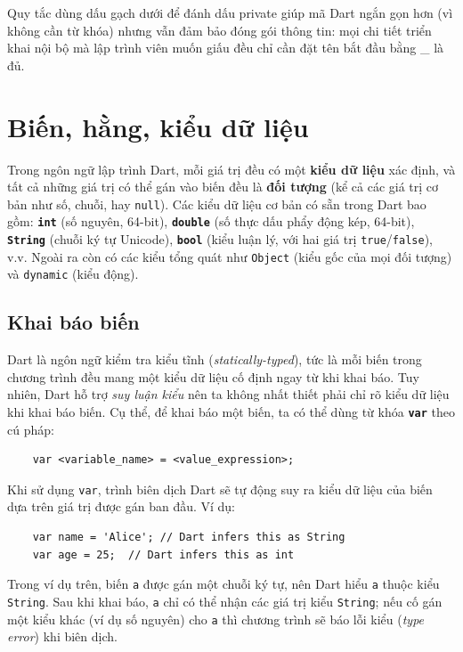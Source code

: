 \documentclass[../DoAn.tex]{subfiles}
\numberwithin{figure}{chapter}
\begin{document}
Quy tắc dùng dấu gạch dưới để đánh dấu private giúp mã Dart ngắn gọn hơn (vì không cần từ khóa) nhưng vẫn đảm bảo đóng gói thông tin: mọi chi tiết triển khai nội bộ mà lập trình viên muốn giấu đều chỉ cần đặt tên bắt đầu bằng \_ là đủ.

\section{Biến, hằng, kiểu dữ liệu}
Trong ngôn ngữ lập trình Dart, mỗi giá trị đều có một \textbf{kiểu dữ liệu} xác định, và tất cả những giá trị có thể gán vào biến đều là \textbf{đối tượng}
(kể cả các giá trị cơ bản như số, chuỗi, hay \texttt{null}). Các kiểu dữ liệu cơ bản có sẵn trong Dart bao gồm: \textbf{\texttt{int}} (số nguyên, 64-bit), \textbf{\texttt{double}} (số thực dấu phẩy động kép, 64-bit), \textbf{\texttt{String}} (chuỗi ký tự Unicode), \textbf{\texttt{bool}} (kiểu luận lý, với hai giá trị \texttt{true}/\texttt{false}), v.v. Ngoài ra còn có các kiểu tổng quát như \texttt{Object} (kiểu gốc của mọi đối tượng) và \texttt{dynamic} (kiểu động). 

\subsection{Khai báo biến} 
Dart là ngôn ngữ kiểm tra kiểu tĩnh (\textit{statically-typed}), tức là mỗi biến trong chương trình đều mang một kiểu dữ liệu cố định ngay từ khi khai báo. Tuy nhiên, Dart hỗ trợ \textit{suy luận kiểu} nên ta không nhất thiết phải chỉ rõ kiểu dữ liệu khi khai báo biến. Cụ thể, để khai báo một biến, ta có thể dùng từ khóa \textbf{\texttt{var}} theo cú pháp: 
\begin{lstlisting}
    var <variable_name> = <value_expression>;
\end{lstlisting}

Khi sử dụng \texttt{var}, trình biên dịch Dart sẽ tự động suy ra kiểu dữ liệu của biến dựa trên giá trị được gán ban đầu. Ví dụ: 
\begin{lstlisting}
    var name = 'Alice'; // Dart infers this as String
    var age = 25;  // Dart infers this as int
\end{lstlisting}

Trong ví dụ trên, biến \texttt{a} được gán một chuỗi ký tự, nên Dart hiểu \texttt{a} thuộc kiểu \texttt{String}. Sau khi khai báo, \texttt{a} chỉ có thể nhận các giá trị kiểu \texttt{String}; nếu cố gán một kiểu khác (ví dụ số nguyên) cho \texttt{a} thì chương trình sẽ báo lỗi kiểu (\textit{type error}) khi biên dịch.  
\end{document}
